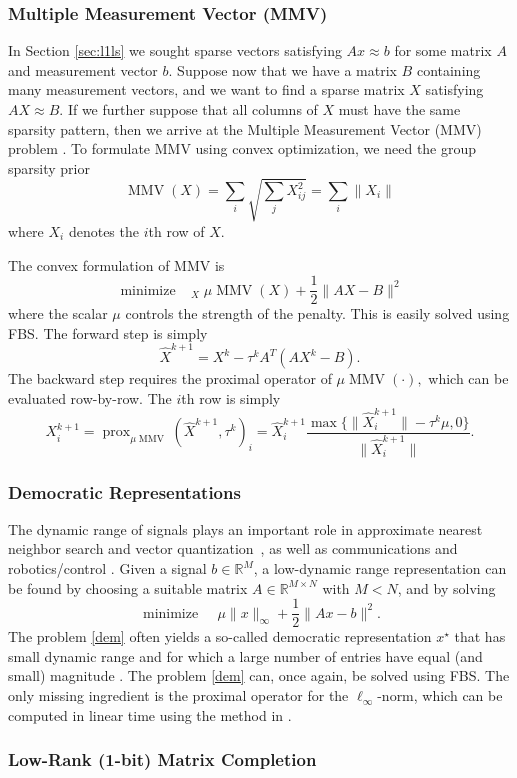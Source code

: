 \documentclass{amsart}
\newcommand{\half}{\frac{1}{2}}
\newcommand{\eqn}[2]{\begin{equation}\label{#1}#2\end{equation}}
\newcommand{\kp}{^{k+1}}
\newcommand{\opt}{^\star}
\newcommand{\reals}{\mathbb{R}}
\DeclareMathOperator*{\mmv}{MMV}
\DeclareMathOperator*{\minimize}{minimize\quad}
\DeclareMathOperator{\prox}{prox}
\theoremstyle{definition}
\begin{document}
 \subsubsection{Multiple Measurement Vector (MMV)}
  In Section \eqref{sec:l1ls} we sought sparse vectors satisfying $Ax\approx b$ for some matrix $A$ and measurement vector $b.$  Suppose now that we have a matrix $B$ containing many measurement vectors, and we want to find a sparse matrix $X$ satisfying $AX\approx B.$   If we further suppose that all columns of $X$ must have the same sparsity pattern, then we arrive at the Multiple Measurement Vector (MMV) problem \cite{CREK05}.  To formulate MMV using convex optimization, we  need the group sparsity prior 
    $$\mmv(X) = \sum_i \sqrt{ \sum_j X_{ij}^2 } = \sum_i \|X_i\|$$
  where $X_i$ denotes the $i$th row of $X.$
  
  The convex formulation of MMV is
  $$\minimize_X  \mu \mmv(X)+\half \|AX-B\|^2$$
  where the scalar $\mu$ controls the strength of the penalty.
  This is easily solved using FBS.  The forward step is simply 
   $$\widehat X\kp = X^k- \tau^kA^T(AX^k-B).$$
  The backward step requires the proximal operator of $\mu \mmv(\cdot),$ which can be evaluated row-by-row.  The $i$th row is simply
    $$X\kp_i = \prox_{\mu \mmv}(\widehat X\kp, \tau^k )_i =  \widehat X\kp_i \frac{\max\{\|\widehat X\kp_i\|-\tau^k\mu,0\} }{\|\widehat X\kp_i\|}.$$


\subsubsection{Democratic Representations}

The dynamic range of signals plays an important role in approximate nearest neighbor search and vector quantization~\cite{JFF11}, as well as communications and robotics/control \cite{SGB14}.
Given a signal $b\in \reals^M$, a low-dynamic range representation can be found by choosing a suitable matrix $A\in \reals^{M\times N}$ with $M<N$, and by solving 
   \eqn{dem}{
     \minimize \mu \|x\|_\infty +  \half \| Ax-b \|^2.
   }
The problem \eqref{dem} often yields a so-called democratic representation $x\opt$ that has small dynamic range and  for which a large number of entries have equal (and small) magnitude \cite{SGB14}. The problem \eqref{dem} can, once again,  be solved using FBS.  The only missing ingredient is the proximal operator for the $\ell_\infty$-norm, which can be computed in linear time using the method in \cite{DSSC08}.


\subsubsection{Low-Rank (1-bit) Matrix Completion}
\end{document}
